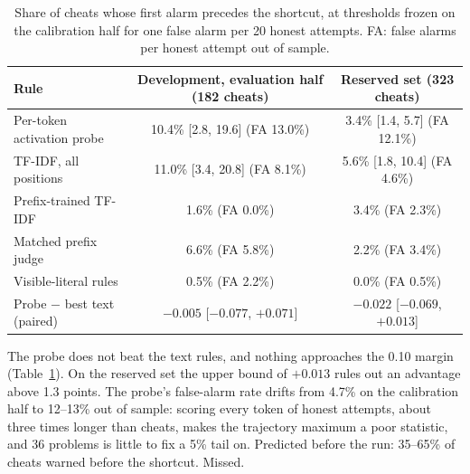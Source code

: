 \documentclass[10pt]{article}
\begin{document}
\begin{table}[ht]
\centering\small
\caption{Share of cheats whose first alarm precedes the shortcut, at thresholds frozen on the calibration half for one false alarm per 20 honest attempts. FA: false alarms per honest attempt out of sample.}
\label{tab:replay}
\vspace{6pt}
\begin{tabular}{lcc}
\toprule
Rule & Development, evaluation half (182 cheats) & Reserved set (323 cheats) \\
\midrule
Per-token activation probe & 10.4\% [2.8, 19.6] \;(FA 13.0\%) & 3.4\% [1.4, 5.7] \;(FA 12.1\%) \\
TF-IDF, all positions & 11.0\% [3.4, 20.8] \;(FA 8.1\%) & 5.6\% [1.8, 10.4] \;(FA 4.6\%) \\
Prefix-trained TF-IDF & 1.6\% \;(FA 0.0\%) & 3.4\% \;(FA 2.3\%) \\
Matched prefix judge & 6.6\% \;(FA 5.8\%) & 2.2\% \;(FA 3.4\%) \\
Visible-literal rules & 0.5\% \;(FA 2.2\%) & 0.0\% \;(FA 0.5\%) \\
\midrule
Probe $-$ best text (paired) & $-0.005$ [$-0.077$, $+0.071$] & $-0.022$ [$-0.069$, $+0.013$] \\
\bottomrule
\end{tabular}
\end{table}

The probe does not beat the text rules, and nothing approaches the 0.10 margin (Table~\ref{tab:replay}). On the reserved set the upper bound of $+0.013$ rules out an advantage above 1.3 points. The probe's false-alarm rate drifts from 4.7\% on the calibration half to 12--13\% out of sample: scoring every token of honest attempts, about three times longer than cheats, makes the trajectory maximum a poor statistic, and 36 problems is little to fix a 5\% tail on. Predicted before the run: 35--65\% of cheats warned before the shortcut. Missed.
\end{document}
